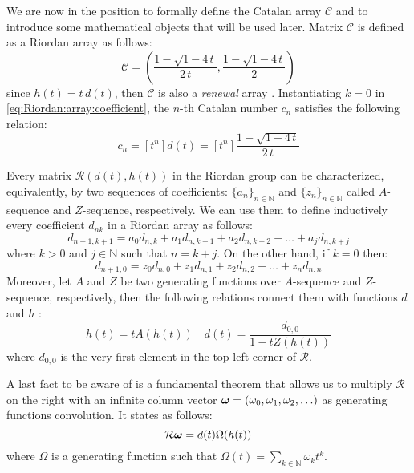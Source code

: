 We are now in the position to formally define the Catalan
array $\mathcal{C}$ and to introduce some mathematical objects
that will be used later. Matrix $\mathcal{C}$ is defined 
as a Riordan array as follows:
\begin{displaymath}
    \mathcal{C}=\left(\frac{1-\sqrt{1-4\,t}}{2\,t},
        \frac{1-\sqrt{1-4\,t}}{2}\right)
\end{displaymath}
since $h(t)=t\,d(t)$, then $\mathcal{C}$ is also a \emph{renewal} array \cite{rogers:1977}.
Instantiating $k=0$ in \autoref{eq:Riordan:array:coefficient},
the $n$-th Catalan number $c_{n}$ satisfies the following relation:
\begin{displaymath}
    c_{n} = [t^{n}]d(t)= [t^{n}]\frac{1-\sqrt{1-4\,t}}{2\,t}
\end{displaymath}

Every matrix $\mathcal{R}(d(t), h(t))$ in the Riordan group can be characterized, equivalently,
by two sequences of coefficients: $\lbrace a_{n}\rbrace_{n\in\mathbb{N}}$  and
$\lbrace z_{n}\rbrace_{n\in\mathbb{N}}$ called $A$-sequence and $Z$-sequence, 
respectively. We can use them to define inductively every coefficient $d_{nk}$ in a Riordan array as follows:
\begin{equation}
    d_{n+1, k+1} = a_{0}d_{n,k} + a_{1}d_{n,k+1} + a_{2}d_{n,k+2} + \ldots + a_{j}d_{n,k+j} 
\end{equation}
where $k>0$ and $j\in\mathbb{N}$ such that $n=k+j$. On the other hand, if $k=0$ then:
\begin{equation}
    d_{n+1, 0} = z_{0}d_{n,0} + z_{1}d_{n,1} + z_{2}d_{n,2} + \ldots + z_{n}d_{n,n} 
\end{equation}
Moreover, let $A$ and $Z$ be two generating functions over $A$-sequence and $Z$-sequence, respectively,
then the following relations connect them with functions $d$ and $h$
\cite{merlini:some:alternative:characterizations:1997}:
\begin{equation}
    h(t) = tA(h(t)) \quad d(t)=\frac{d_{0,0}}{1-tZ(h(t))}
\end{equation}
where $d_{0,0}$ is the very first element in the top left corner of $\mathcal{R}$.

A last fact to be aware of is a fundamental theorem that allows us to multiply $\mathcal{R}$ on the right with
an infinite column vector $\boldsymbol{\omega}=(\omega_{0},\omega_{1},\omega_{2},\ldots)$ 
as generating functions convolution. It states as follows:
\begin{equation}
    \mathcal{R}\boldsymbol{\omega} = d(t)\Omega(h(t))    
\end{equation}
where $\Omega$ is a generating function such that $\Omega(t)=\sum_{k\in\mathbb{N}}{\omega_{k}t^{k}}$.

